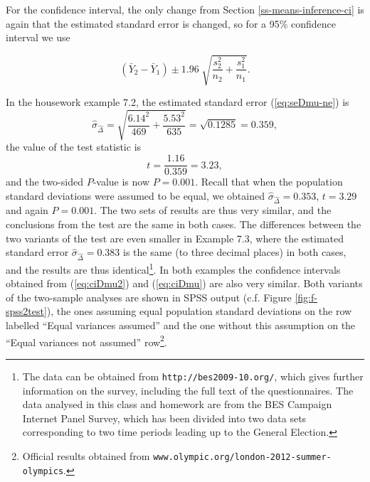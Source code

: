 \documentclass[11pt,a4paper,openany]{book}
\let\rmarkdownfootnote\footnote%
\def\footnote{\protect\rmarkdownfootnote}
\begin{document}
For the confidence interval, the only change from Section
\ref{ss-means-inference-ci} is again that the estimated standard error
is changed, so for a 95\% confidence interval we use

\begin{equation}(\bar{Y}_{2}-\bar{Y}_{1}) \pm 1.96 \;
\sqrt{
\frac{s^{2}_{2}}{n_{2}}+\frac{s^{2}_{1}}{n_{1}}
}.
\label{eq:ciDmu}\end{equation}

In the housework example 7.2, the estimated standard error
(\ref{eq:seDmu-ne}) is \[\hat{\sigma}_{\hat{\Delta}}=
\sqrt{
\frac{6.14^{2}}{469}+
\frac{5.53^{2}}{635}
}=
\sqrt{0.1285}=0.359,\] the value of the test statistic is
\[t=\frac{1.16}{0.359}=3.23,\] and the two-sided \(P\)-value is now
\(P=0.001\). Recall that when the population standard deviations were
assumed to be equal, we obtained \(\hat{\sigma}_{\hat{\Delta}}=0.353\),
\(t=3.29\) and again \(P=0.001\). The two sets of results are thus very
similar, and the conclusions from the test are the same in both cases.
The differences between the two variants of the test are even smaller in
Example 7.3, where the estimated standard error
\(\hat{\sigma}_{\hat{\Delta}}=0.383\) is the same (to three decimal
places) in both cases, and the results are thus identical\footnote{The
  data can be obtained from \texttt{http://bes2009-10.org/}, which gives
  further information on the survey, including the full text of the
  questionnaires. The data analysed in this class and homework are from
  the BES Campaign Internet Panel Survey, which has been divided into
  two data sets corresponding to two time periods leading up to the
  General Election.}. In both examples the confidence intervals obtained
from (\ref{eq:ciDmu2}) and (\ref{eq:ciDmu}) are also very similar. Both
variants of the two-sample analyses are shown in SPSS output (c.f.
Figure \ref{fig:f-spss2test}), the ones assuming equal population
standard deviations on the row labelled ``Equal variances assumed'' and
the one without this assumption on the ``Equal variances not assumed''
row\footnote{Official results obtained from
  \texttt{www.olympic.org/london-2012-summer-olympics}.}.
\end{document}
